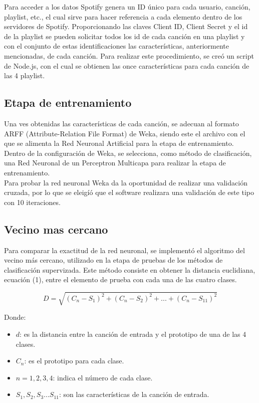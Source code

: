 \documentclass[conference]{IEEEtran}
\begin{document}
Para acceder a los datos Spotify genera un ID único para cada usuario, canción, playlist, etc., el cual sirve para hacer referencia a cada elemento dentro de los servidores de Spotify. Proporcionando las claves Client ID, Client Secret y el id de la playlist se pueden solicitar todos los id de cada canción en una playlist y con el conjunto de estas identificaciones las características, anteriormente mencionadas, de cada canción. Para realizar este procedimiento, se creó un script de Node.js, con el cual se obtienen las once características para cada canción de las 4 playlist.\\

\subsection{Etapa de entrenamiento}
Una ves obtenidas las características de cada canción, se adecuan al formato ARFF (Attribute-Relation File Format) de Weka, siendo este el archivo con el que se alimenta la Red Neuronal Artificial para la etapa de entrenamiento.\\
Dentro de la configuración de Weka, se selecciona, como método de clasificación, una Red Neuronal de un Perceptron Multicapa para realizar la etapa de entrenamiento.\\

Para probar la red neuronal Weka da la oportunidad de realizar una validación cruzada, por lo que se eleigíó que el software realizara una validación de este tipo con 10 iteraciones.


\subsection{Vecino mas cercano}
Para comparar la exactitud de la red neuronal, se implementó el algoritmo del vecino m\'as cercano, utilizado en la etapa de pruebas de los métodos de clasificación supervizada. Este m\'etodo consiste en obtener la distancia euclidiana, ecuaci\'on (1), entre el elemento de prueba con cada una de las cuatro clases.

\begin{equation}
	D = \sqrt{ (C_n - S_{1} )^2 + (C_n - S_{2} )^2 + ... + (C_n - S_{11} )^2 }
\end{equation}

Donde:\\
\begin{itemize}
	\item $d$: es la distancia entre la canción de entrada y el prototipo de una de las 4 clases.
	\item $C_n$: es el prototipo para cada clase.
	\item $n = 1, 2, 3, 4$: indica el número de cada clase.
	\item $S_{1}, S_{2}, S_{3} ... S_{11}$: son las características de la canción de entrada. \\
\end{itemize}
\end{document}
